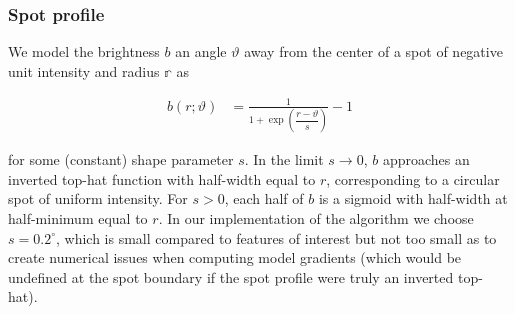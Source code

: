 \documentclass[modern,linenumbers]{aastex62}
\begin{document}
\subsubsection{Spot profile}
%
We model the brightness $b$ an angle $\vartheta$ away from the
center of a spot of negative unit intensity and radius $\mathbb{r}$ as
%
\begin{linenomath}\begin{align}
        \label{eq:brvartheta}
        b(r; \vartheta) & = \frac{1}{1 + \exp\left(\dfrac{r-\vartheta}{s}\right)} - 1
    \end{align}\end{linenomath}
%
for some (constant) shape parameter $s$. In the limit $s \rightarrow 0$, $b$ approaches an
inverted top-hat function with half-width equal to $r$,
corresponding to a circular spot of uniform intensity. For $s > 0$, each half
of $b$ is a sigmoid with half-width at half-minimum equal to $r$.
In our implementation of the algorithm we choose $s = 0.2^\circ$,
which is small compared to features of interest but not too small as to
create numerical issues when computing model gradients (which would be
undefined at the spot boundary if the spot profile were truly an inverted top-hat).
\end{document}
